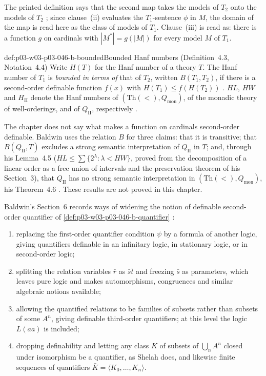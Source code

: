 The printed definition says that the second map takes the models of
\(T_2\) onto the models of \(T_2\) \cite[p.~471]{Baldwin1985DSOQ}; since
clause~(ii) evaluates the \(T_1\)-sentence \(\phi\) in \(M\), the domain of
the map is read here as the class of models of \(T_1\). Clause~(iii) is
read as: there is a function \(g\) on cardinals with \(|M^*|=g(|M|)\) for
every model \(M\) of \(T_1\).

\begin{hbdefinition}{def:p03-w03-p03-046-b-bounded}{Bounded Hanf numbers (Definition~4.3, Notation~4.4)}
Write \(H(T)\) for the Hanf number of a theory \(T\). The Hanf number of
\(T_1\) is \emph{bounded in terms of} that of \(T_2\), written
\(B(T_1,T_2)\), if there is a second-order definable function \(f(x)\) with
\(H(T_1)\le f(H(T_2))\) \cite[p.~471, Definition~4.3]{Baldwin1985DSOQ}.
\(HL\), \(HW\) and \(H_{\mathrm{II}}\) denote the Hanf numbers of
\((\mathrm{Th}(<),Q_{\mathrm{mon}})\), of the monadic theory of
well-orderings, and of \(Q_{\mathrm{II}}\), respectively
\cite[p.~471, Notation~4.4]{Baldwin1985DSOQ}.
\end{hbdefinition}

The chapter does not say what makes a function on cardinals second-order
definable. Baldwin uses the relation \(B\) for three claims: that it is
transitive; that \(B(Q_{\mathrm{II}},T)\) excludes a strong semantic
interpretation of \(Q_{\mathrm{II}}\) in \(T\); and, through his Lemma~4.5
(\(HL\le\sum\{2^\lambda:\lambda<HW\}\), proved from the decomposition of a
linear order as a free union of intervals and the preservation theorem of
his Section~3), that \(Q_{\mathrm{II}}\) has no strong semantic
interpretation in \((\mathrm{Th}(<),Q_{\mathrm{mon}})\), his Theorem~4.6
\cite[pp.~471--472]{Baldwin1985DSOQ}. These results are not proved in
this chapter.

Baldwin's Section~6 records ways of widening the notion of definable
second-order quantifier of \cref{def:p03-w03-p03-046-b-quantifier}
\cite[pp.~476--477]{Baldwin1985DSOQ}:
\begin{enumerate}
  \item replacing the first-order quantifier condition \(\psi\) by a
        formula of another logic, giving quantifiers definable in an
        infinitary logic, in stationary logic, or in second-order logic;
  \item splitting the relation variables \(\bar r\) as \(\bar s\bar t\) and
        freezing \(\bar s\) as parameters, which leaves pure logic and makes
        automorphisms, congruences and similar algebraic notions available;
  \item allowing the quantified relations to be families of subsets rather
        than subsets of some \(A^n\), giving definable third-order
        quantifiers; at this level the logic \(L(aa)\) is included;
  \item dropping definability and letting any class \(K\) of subsets of
        \(\bigcup_nA^n\) closed under isomorphism be a quantifier, as Shelah
        does, and likewise finite sequences of quantifiers
        \(\bar K=\langle K_0,\dots,K_n\rangle\).
\end{enumerate}

